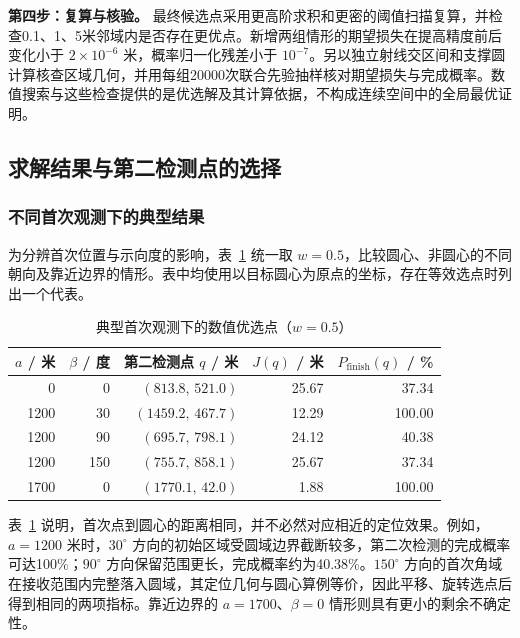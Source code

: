 \documentclass[UTF8,a4paper,zihao=-4,fontset=none]{ctexart}
\begin{document}
\textbf{第四步：复算与核验。} 最终候选点采用更高阶求积和更密的阈值扫描复算，并检查0.1、1、5米邻域内是否存在更优点。新增两组情形的期望损失在提高精度前后变化小于 \(2\times10^{-6}\) 米，概率归一化残差小于 \(10^{-7}\)。另以独立射线交区间和支撑圆计算核查区域几何，并用每组20000次联合先验抽样核对期望损失与完成概率。数值搜索与这些检查提供的是优选解及其计算依据，不构成连续空间中的全局最优证明。

\subsection{求解结果与第二检测点的选择}

\subsubsection{不同首次观测下的典型结果}

为分辨首次位置与示向度的影响，表~\ref{tab:q2-typical-results} 统一取 \(w=0.5\)，比较圆心、非圆心的不同朝向及靠近边界的情形。表中均使用以目标圆心为原点的坐标，存在等效选点时列出一个代表。

\begin{table}[htbp]
  \centering
  \caption{典型首次观测下的数值优选点（\(w=0.5\)）}
  \label{tab:q2-typical-results}
  \small
  \renewcommand{\arraystretch}{1.08}
  \begin{tabular}{rrrrr}
    \toprule
    \(a\) / 米 & \(\beta\) / 度 & 第二检测点 \(q\) / 米 & \(J(q)\) / 米 & \(P_{\mathrm{finish}}(q)\) / \% \\
    \midrule
    0 & 0 & \((813.8,\,521.0)\) & 25.67 & 37.34 \\
    1200 & 30 & \((1459.2,\,467.7)\) & 12.29 & 100.00 \\
    1200 & 90 & \((695.7,\,798.1)\) & 24.12 & 40.38 \\
    1200 & 150 & \((755.7,\,858.1)\) & 25.67 & 37.34 \\
    1700 & 0 & \((1770.1,\,42.0)\) & 1.88 & 100.00 \\
    \bottomrule
  \end{tabular}
\end{table}

表~\ref{tab:q2-typical-results} 说明，首次点到圆心的距离相同，并不必然对应相近的定位效果。例如，\(a=1200\) 米时，\(30^\circ\) 方向的初始区域受圆域边界截断较多，第二次检测的完成概率可达100\%；\(90^\circ\) 方向保留范围更长，完成概率约为40.38\%。\(150^\circ\) 方向的首次角域在接收范围内完整落入圆域，其定位几何与圆心算例等价，因此平移、旋转选点后得到相同的两项指标。靠近边界的 \(a=1700\)、\(\beta=0\) 情形则具有更小的剩余不确定性。
\end{document}
